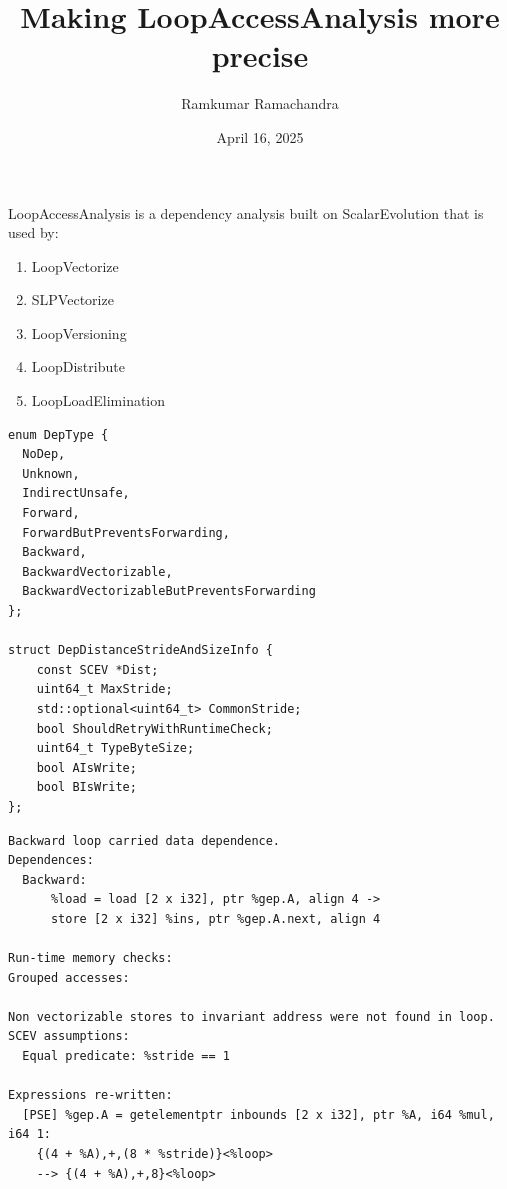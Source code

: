 \documentclass{beamer}
\title{Making LoopAccessAnalysis more precise}
\author{Ramkumar Ramachandra}
\institute{Codasip}
\date{April 16, 2025}
\begin{document}
\begin{frame}
  \titlepage
\end{frame}
\begin{frame}
  LoopAccessAnalysis is a dependency analysis built on ScalarEvolution that is used by:
  \begin{enumerate}
    \item LoopVectorize
    \item SLPVectorize
    \item LoopVersioning
    \item LoopDistribute
    \item LoopLoadElimination
  \end{enumerate}
\end{frame}

\begin{frame}[containsverbatim]
  \begin{verbatim}
enum DepType {
  NoDep,
  Unknown,
  IndirectUnsafe,
  Forward,
  ForwardButPreventsForwarding,
  Backward,
  BackwardVectorizable,
  BackwardVectorizableButPreventsForwarding
};

struct DepDistanceStrideAndSizeInfo {
    const SCEV *Dist;
    uint64_t MaxStride;
    std::optional<uint64_t> CommonStride;
    bool ShouldRetryWithRuntimeCheck;
    uint64_t TypeByteSize;
    bool AIsWrite;
    bool BIsWrite;
};
  \end{verbatim}
\end{frame}

\begin{frame}[containsverbatim]
  \begin{adjustwidth}{-1em}{-1em}
    \begin{verbatim}
Backward loop carried data dependence.
Dependences:
  Backward:
      %load = load [2 x i32], ptr %gep.A, align 4 ->
      store [2 x i32] %ins, ptr %gep.A.next, align 4

Run-time memory checks:
Grouped accesses:

Non vectorizable stores to invariant address were not found in loop.
SCEV assumptions:
  Equal predicate: %stride == 1

Expressions re-written:
  [PSE] %gep.A = getelementptr inbounds [2 x i32], ptr %A, i64 %mul, i64 1:
    {(4 + %A),+,(8 * %stride)}<%loop>
    --> {(4 + %A),+,8}<%loop>
    \end{verbatim}
  \end{adjustwidth}
\end{frame}
\end{document}
